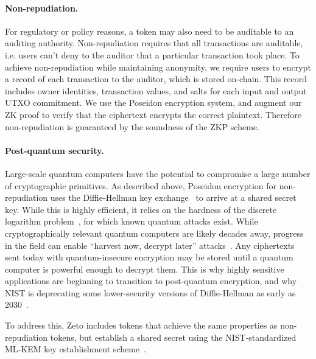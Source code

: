 \paragraph{Non-repudiation.} For regulatory or policy reasons, a token may also need to be auditable to an auditing authority. Non-repudiation requires that all transactions are auditable, i.e. users can't deny to the auditor that a particular transaction took place. To achieve non-repudiation while maintaining anonymity, we require users to encrypt a record of each transaction to the auditor, which is stored on-chain. This record includes owner identities, transaction values, and salts for each input and output UTXO commitment. We use the Poseidon encryption system, and augment our ZK proof to verify that the ciphertext encrypts the correct plaintext. Therefore non-repudiation is guaranteed by the soundness of the ZKP scheme.

\paragraph{Post-quantum security.} Large-scale quantum computers have the potential to compromise a large number of cryptographic primitives. As described above, Poseidon encryption for non-repudiation uses the Diffie-Hellman key exchange~\cite{TODO} to arrive at a shared secret key. While this is highly efficient, it relies on the hardness of the discrete logarithm problem~\cite{TODO}, for which known quantum attacks exist. While cryptographically relevant quantum computers are likely decades away, progress in the field can enable ``harvest now, decrypt later'' attacks~\cite{TODO}. Any ciphertexts sent today with quantum-insecure encryption may be stored until a quantum computer is powerful enough to decrypt them. This is why highly sensitive applications are beginning to transition to post-quantum encryption, and why NIST is deprecating some lower-security versions of Diffie-Hellman as early as 2030~\cite{TODO}.

To address this, Zeto includes tokens that achieve the same properties as non-repudiation tokens, but establish a shared secret using the NIST-standardized ML-KEM key establishment scheme~\cite{TODO}.



